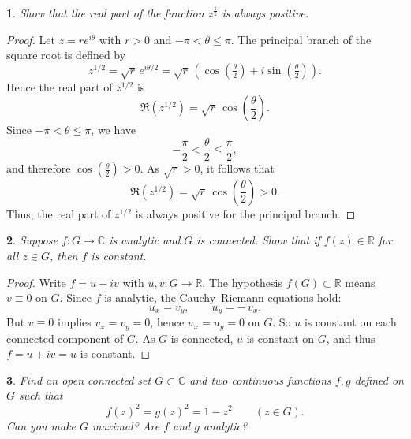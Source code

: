\documentclass[12pt, a4paper]{report}
\theoremstyle{spaced}
\newtheorem{exercise}{}
\newcommand{\setexercise}[1]{\setcounter{exercise}{#1-1}}
\begin{document}
\setexercise{12}
\begin{exercise}
	Show that the real part of the function \(z^{\frac{1}{2}}\) is always positive.
\end{exercise}
\begin{proof}
	Let \(z = re^{i\theta}\) with \(r > 0\) and \(-\pi < \theta \leq \pi\).
	The principal branch of the square root is defined by
	\[
		z^{1/2} = \sqrt{r}\, e^{i\theta/2} = \sqrt{r}\,(\cos(\tfrac{\theta}{2}) + i\sin(\tfrac{\theta}{2})).
	\]
	Hence the real part of \(z^{1/2}\) is
	\[
		\Re(z^{1/2}) = \sqrt{r}\,\cos\!\left(\frac{\theta}{2}\right).
	\]
	Since \(-\pi < \theta \leq \pi\), we have
	\[
		-\frac{\pi}{2} < \frac{\theta}{2} \leq \frac{\pi}{2},
	\]
	and therefore \(\cos(\tfrac{\theta}{2}) > 0\).
	As \(\sqrt{r} > 0\), it follows that
	\[
		\Re(z^{1/2}) = \sqrt{r}\,\cos\!\left(\frac{\theta}{2}\right) > 0.
	\]
	Thus, the real part of \(z^{1/2}\) is always positive for the principal branch.
\end{proof}


\setexercise{14}
\begin{exercise}
	Suppose \(f:G\to\mathbb{C}\) is analytic and \(G\) is connected. Show that if \(f(z)\in\mathbb{R}\) for all \(z\in G\), then \(f\) is constant.
\end{exercise}

\begin{proof}
	Write \(f=u+iv\) with \(u,v:G\to\mathbb{R}\). The hypothesis \(f(G)\subset\mathbb{R}\)
	means \(v\equiv 0\) on \(G\). Since \(f\) is analytic, the Cauchy--Riemann equations hold:
	\[
		u_x = v_y,\qquad u_y = -\,v_x .
	\]
	But \(v\equiv 0\) implies \(v_x=v_y=0\), hence \(u_x=u_y=0\) on \(G\). So \(u\) is constant on each connected component
	of \(G\). As \(G\) is connected, \(u\) is constant on \(G\), and thus \(f=u+iv=u\) is constant.

\end{proof}


\setexercise{16}
\begin{exercise}
	Find an open connected set \(G\subset\mathbb{C}\) and two continuous functions \(f,g\) defined on \(G\) such that
	\[
		f(z)^2=g(z)^2=1-z^2\qquad(z\in G).
	\]
	Can you make \(G\) maximal? Are \(f\) and \(g\) analytic?
\end{exercise}
\end{document}

